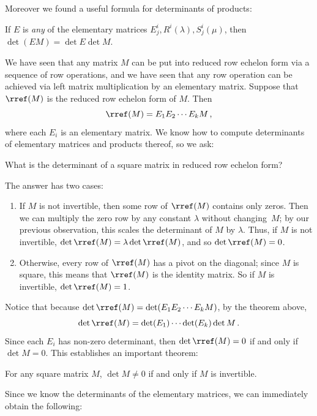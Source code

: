 Moreover  we found a useful formula for determinants of products:

\begin{theorem}
If $E$ is \emph{ any} of the elementary matrices $E^i_j, R^i(\lambda), S^i_j(\mu)$, then $\det(EM)=\det E \det M$.
\end{theorem}




We have seen that any matrix $M$ can be put into reduced row echelon form via a sequence of row operations, and we have seen that any row operation can be achieved via left matrix multiplication by an elementary matrix.  Suppose that $\rref(M)$ is the reduced row echelon form of $M$.  Then \[\rref(M)=E_1E_2\cdots E_kM\, ,\] where each $E_i$ is an elementary matrix.
We know how to compute determinants of elementary matrices and products thereof, so we ask:

\begin{center}
What is the determinant of a square matrix in reduced row echelon form?  
\end{center}
The answer has two cases:
\begin{enumerate}
\item If $M$ is not invertible, then some row of $\rref(M)$ contains only zeros.  Then we can multiply the zero row by any constant $\lambda$ without changing~$M$; by our previous observation, this scales the determinant of $M$ by $\lambda$.  Thus, if $M$ is not invertible, $\det \rref(M)=\lambda \det \rref(M)$, and so $\det \rref(M)=0$.  

\item Otherwise, every row of $\rref(M)$ has a pivot on the diagonal; since $M$ is square, this means that $\rref(M)$ is the identity matrix.  So if $M$ is invertible, $\det \rref(M)=1$.
\end{enumerate}
Notice that because $\det \rref(M) = \det (E_1E_2\cdots E_kM)$, by the theorem above, \[\det \rref(M)=\det (E_1) \cdots \det (E_k) \det M\, .\]  Since each $E_i$ has non-zero determinant, then $\det \rref(M)=0$ if and only if $\det M=0$.
This establishes an important theorem:


\begin{theorem}
\label{detinvertible}
For any square matrix $M$, $\det M\neq 0$ if and only if $M$ is invertible.
\end{theorem}
Since we know the determinants of the elementary matrices, we can immediately obtain the following:


